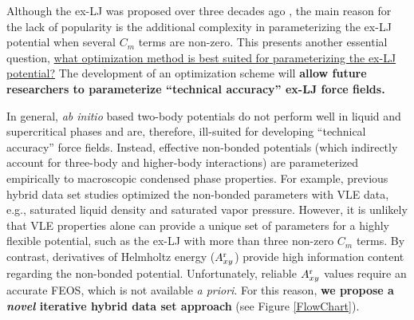 \documentclass[12pt,a4paper]{article}
\begin{document}



Although the ex-LJ was proposed over three decades ago \cite{Kalos1972}, the main reason for the lack of popularity is the additional complexity in parameterizing the ex-LJ potential when several $C_m$ terms are non-zero. This presents another essential question, \ul{what optimization method is best suited for parameterizing the ex-LJ potential?} The development of an optimization scheme will \textbf{allow future researchers to parameterize ``technical accuracy'' ex-LJ force fields.}

In general, \textit{ab initio} based two-body potentials do not perform well in liquid and supercritical phases and are, therefore, ill-suited for developing ``technical accuracy'' force fields. Instead, effective non-bonded potentials (which indirectly account for three-body and higher-body interactions) are parameterized empirically to macroscopic condensed phase properties. For example, previous hybrid data set studies optimized the non-bonded parameters with VLE data, e.g., saturated liquid density and saturated vapor pressure. However, it is unlikely that VLE properties alone can provide a unique set of parameters for a highly flexible potential, such as the ex-LJ with more than three non-zero $C_m$ terms. By contrast, derivatives of Helmholtz energy ($A_{xy}^{\rm r}$) provide high information content regarding the non-bonded potential. Unfortunately, reliable $A_{xy}^{\rm r}$ values require an accurate FEOS, which is not available \textit{a priori}. For this reason, \textbf{we propose a \textit{novel} iterative hybrid data set approach} (see Figure \ref{FlowChart}).

\end{document}
